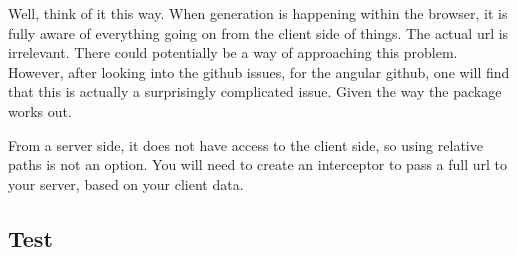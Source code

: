 Well, think of it this way. When generation is happening within the browser, it is fully aware of everything going on from the client side of things. The actual url is irrelevant. There could potentially be a way of approaching this problem. However, after looking into the github issues, for the angular github, one will find that this is actually a surprisingly complicated issue. Given the way the package works out. 

From a server side, it does not have access to the client side, so using relative paths is not an option. You will need to create an interceptor to pass a full url to your server, based on your client data. 

\subsection{Test}